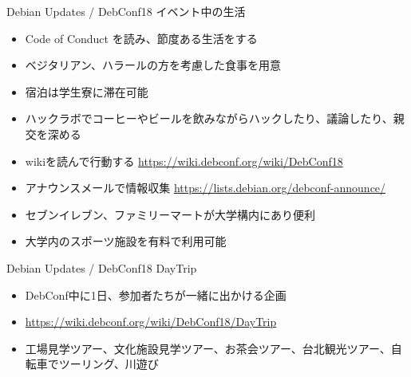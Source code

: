 \documentclass[cjk,dvipdfmx,10pt,compress,%
hyperref={bookmarks=true,bookmarksnumbered=true,bookmarksopen=false,%
colorlinks=false,%
pdftitle={第 132 回 関西 Debian 勉強会},%
pdfauthor={かわだ},%
pdfsubject={資料},%
}]{beamer}
\begin{document}
\begin{frame}{Debian Updates / DebConf18}%
イベント中の生活
\begin{itemize}
  \item Code of Conduct を読み、節度ある生活をする
  \item ベジタリアン、ハラールの方を考慮した食事を用意
  \item 宿泊は学生寮に滞在可能
  \item ハックラボでコーヒーやビールを飲みながらハックしたり、議論したり、親交を深める
  \item wikiを読んで行動する \url{https://wiki.debconf.org/wiki/DebConf18}
  \item アナウンスメールで情報収集 \url{https://lists.debian.org/debconf-announce/}
  \item セブンイレブン、ファミリーマートが大学構内にあり便利
  \item 大学内のスポーツ施設を有料で利用可能
\end{itemize}
\end{frame}

\begin{frame}{Debian Updates / DebConf18}%
DayTrip
\begin{itemize}
\item DebConf中に1日、参加者たちが一緒に出かける企画
\item \url{https://wiki.debconf.org/wiki/DebConf18/DayTrip}
\item 工場見学ツアー、文化施設見学ツアー、お茶会ツアー、台北観光ツアー、自転車でツーリング、川遊び
\end{itemize}
\end{frame}
\end{document}
